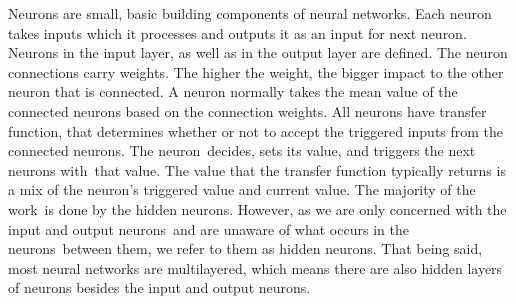 Neurons are small, basic building components of neural networks. Each neuron takes inputs which it processes and outputs it as an input for next neuron. Neurons in the input layer, as well as in the output layer are defined. The neuron connections carry weights. The higher the weight, the bigger impact to the other neuron that is connected. A neuron normally takes the mean value of the connected neurons based on the connection weights. All neurons have transfer function, that determines whether or not to accept the triggered inputs from the connected neurons. The neuron decides, sets its value, and triggers the next neurons with that value.
The value that the transfer function typically returns is a mix of the neuron's triggered value and current value. The majority of the work is done by the hidden neurons. However, as we are only concerned with the input and output neurons and are unaware of what occurs in the neurons between them, we refer to them as hidden neurons. That being said, most neural networks are multilayered, which means there are also hidden layers of neurons besides the input and output neurons.

